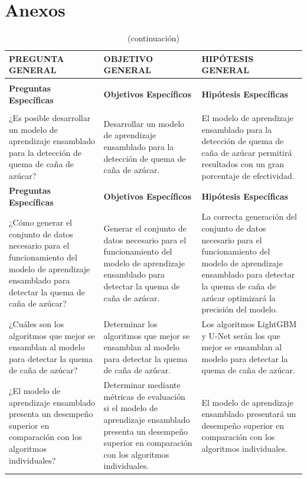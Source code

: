 \clearpage
\section{Anexos}
\begin{longtable}{>{\raggedright\arraybackslash}p{5cm}>{\raggedright\arraybackslash}p{5cm}>{\raggedright\arraybackslash}p{5cm}}
    \caption{Matriz de consistencia del presente estudio.} \label{tab:preguntas_objetivos_hipotesis} \\
    \hline
    \textbf{PREGUNTA GENERAL} & \textbf{OBJETIVO GENERAL} & \textbf{HIPÓTESIS GENERAL} \\
    \hline
    \endfirsthead 
    \caption[]{(continuación)} \\
    \hline
    \textbf{Preguntas Específicas} & \textbf{Objetivos Específicos} & \textbf{Hipótesis Específicas} \\
    \hline
    \endhead
    \hline
    \multicolumn{3}{r}{\textit{Continúa en la siguiente página ...}} \\
    \endfoot
    \hline
    \endlastfoot
    ¿Es posible desarrollar un modelo de aprendizaje ensamblado para la detección de quema de caña de azúcar? & Desarrollar un modelo de aprendizaje ensamblado para la detección de quema de caña de azúcar. & El modelo de aprendizaje ensamblado para la detección de quema de caña de azúcar permitirá resultados con un gran porcentaje de efectividad. \\
    \hline
    \textbf{Preguntas Específicas} & \textbf{Objetivos Específicos} & \textbf{Hipótesis Específicas} \\
    \hline
    ¿Cómo generar el conjunto de datos necesario para el funcionamiento del modelo de aprendizaje ensamblado para detectar la quema de caña de azúcar? & Generar el conjunto de datos necesario para el funcionamiento del modelo de aprendizaje ensamblado para detectar la quema de caña de azúcar. & La correcta generación del conjunto de datos necesario para el funcionamiento del modelo de aprendizaje ensamblado para detectar la quema de caña de azúcar optimizará la precisión del modelo. \\
    ¿Cuáles son los algoritmos que mejor se ensamblan al modelo para detectar la quema de caña de azúcar? & Determinar los algoritmos que mejor se ensamblan al modelo para detectar la quema de caña de azúcar. & Los algoritmos LightGBM y U-Net serán los que mejor se ensamblan al modelo para detectar la quema de caña de azúcar. \\
    ¿El modelo de aprendizaje ensamblado presenta un desempeño superior en comparación con los algoritmos individuales? & Determinar mediante métricas de evaluación si el modelo de aprendizaje ensamblado presenta un desempeño superior en comparación con los algoritmos individuales. & El modelo de aprendizaje ensamblado presentará un desempeño superior en comparación con los algoritmos individuales. \\
    \hline
\end{longtable}

